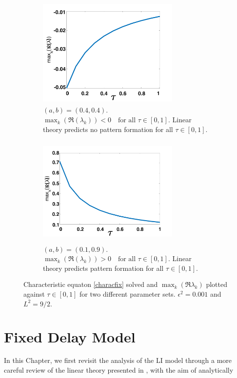 \begin{figure}[H]
    \centering
    \begin{subfigure}[b]{0.45\textwidth}
        \centering
        \includegraphics[width=7cm,height = 5.5cm]{disp1.png}
        \caption{$(a,b)=(0.4,0.4)$. $\max_k(\Re(\lambda_k))<0 \quad \text{for all }\tau\in[0,1]$. Linear theory predicts no pattern formation for all $\tau\in[0,1]$. }
        \label{}
    \end{subfigure}
    \hfill
    \begin{subfigure}[b]{0.45\textwidth}
        \centering
        \includegraphics[width=7cm,height = 5.5cm]{disp2.png}
        \caption{$(a,b)=(0.1,0.9)$. $\max_k(\Re(\lambda_k))>0 \quad \text{for all }\tau\in[0,1]$. Linear theory predicts pattern formation for all $\tau\in[0, 1]$.}
        \label{}
    \end{subfigure}
    \caption{Characteristic equaton \eqref{characfix} solved and $\max_k(\Re{\lambda_k})$ plotted against $\tau\in[0,1]$ for two different parameter sets. $\epsilon^2=0.001$ and $L^2=9/2$.}
    \label{fig:dispfixed}
\end{figure}
\chapter{Fixed Delay Model}

In this Chapter, we first revisit the analysis of the LI model through a more careful review of the linear theory presented in \cite{yigaffneyli,jiang}, with the aim of analytically


